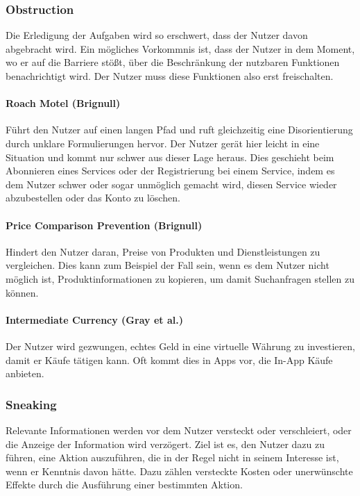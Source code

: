 \documentclass[a4paper]{article}
\begin{document}
\subsubsection{Obstruction} 
\label{sssec:obstruction}
Die Erledigung der Aufgaben wird so erschwert, dass der Nutzer davon abgebracht wird. Ein mögliches Vorkommnis ist, dass der Nutzer in dem Moment, wo er auf die Barriere stößt, über die Beschränkung der nutzbaren Funktionen benachrichtigt wird. Der Nutzer muss diese Funktionen also erst freischalten.	

\paragraph{Roach Motel (Brignull)} 
\label{para:roach_motel}
Führt den Nutzer auf einen langen Pfad und ruft gleichzeitig eine Disorientierung durch unklare Formulierungen hervor. Der Nutzer gerät hier leicht in eine Situation und kommt nur schwer aus dieser Lage heraus. Dies geschieht beim Abonnieren eines Services oder der Registrierung bei einem Service, indem es dem Nutzer schwer oder sogar unmöglich gemacht wird, diesen Service wieder abzubestellen oder das Konto zu löschen.

\paragraph{Price Comparison Prevention (Brignull)} 
\label{para:price_comparison_prevention}
Hindert den Nutzer daran, Preise von Produkten und Dienstleistungen zu vergleichen. Dies kann zum Beispiel der Fall sein, wenn es dem Nutzer nicht möglich ist, Produktinformationen zu kopieren, um damit Suchanfragen stellen zu können.

\paragraph{Intermediate Currency (Gray et al.)} 
\label{para:intermediate_currency}
Der Nutzer wird gezwungen, echtes Geld in eine virtuelle Währung zu investieren, damit er Käufe tätigen kann. Oft kommt dies in Apps vor, die In-App Käufe anbieten.

\subsubsection{Sneaking}
\label{sssec:sneaking}
Relevante Informationen werden vor dem Nutzer versteckt oder verschleiert, oder die Anzeige der Information wird verzögert. Ziel ist es, den Nutzer dazu zu führen, eine Aktion auszuführen, die in der Regel nicht in seinem Interesse ist, wenn er Kenntnis davon hätte. Dazu zählen versteckte Kosten oder unerwünschte Effekte durch die Ausführung einer bestimmten Aktion.
\end{document}
